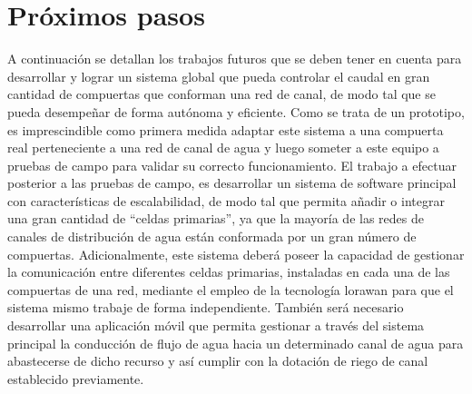 \section{Próximos pasos}

A continuación se detallan los trabajos futuros que se deben tener en cuenta para desarrollar y lograr un sistema global que pueda controlar el caudal en gran cantidad de compuertas que conforman una red de canal, de modo tal que se pueda desempeñar de forma autónoma y eficiente. 
Como se trata de un prototipo, es imprescindible como primera medida adaptar este sistema a una compuerta real perteneciente a una red de canal de agua y luego someter a este equipo a pruebas de campo para validar su correcto funcionamiento.
El trabajo a efectuar posterior a las pruebas de campo, es desarrollar un sistema de software principal con características de escalabilidad, de modo tal que permita añadir o integrar una gran cantidad de “celdas primarias”, ya que la mayoría de las redes de canales de distribución de agua están conformada por un gran número de compuertas. Adicionalmente, este sistema deberá poseer la capacidad de gestionar la comunicación entre diferentes celdas primarias, instaladas en cada una de las compuertas de una red, mediante el empleo de la tecnología lorawan para que el sistema mismo trabaje de forma independiente. También será necesario desarrollar una aplicación móvil que permita gestionar a través del sistema principal la conducción de flujo de agua hacia un determinado canal de agua para abastecerse de dicho recurso y así cumplir con la dotación de riego de canal establecido previamente. 